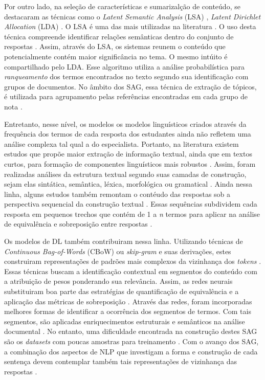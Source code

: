 Por outro lado, na seleção de características e sumarizalção de conteúdo, se destacaram as técnicas como o \textit{Latent Semantic Analysis} (LSA) \cite{landauer1998}, \textit{Latent Dirichlet Allocation} (LDA) \cite{blei2003}. O LSA é uma das mais utilizadas na literatura \cite{basu2013, sahu2020}. O uso desta técnica compreende identificar relações semânticas dentro do conjunto de respostas \cite{mohler2009}. Assim, através do LSA, os sistemas reunem o conteúdo que potencialmente contém maior significância no tema. O mesmo intúito é compartilhado pelo LDA. Esse algoritmo utiliza a análise probabilística para \textit{ranqueamento} dos termos encontrados no texto segundo sua identificação com grupos de documentos. No âmbito dos SAG, essa técnica de extração de tópicos, é utilizada para agrupamento pelas referências encontradas em cada grupo de nota \cite{basu2013, zhang2022}.

Entretanto, nesse nível, os modelos os modelos linguísticos criados através da frequência dos termos de cada resposta dos estudantes ainda não refletem uma análise complexa tal qual a do especialista. Portanto, na literatura existem estudos que propõe maior extração de informação textual, ainda que em textos curtos, para formação de componentes linguísticos mais robustos \cite{saha2018, zesch2018}. Assim, foram realizadas análises da estrutura textual segundo suas camadas de construção, sejam elas sintática, semântica, léxica, morfológica ou gramatical \cite{ramachandran2015b, roy2016}. Ainda nessa linha, alguns estudos também remontam o contéudo das respostas sob a perspectiva sequencial da construção textual \cite{kumar2017}. Essas sequências subdividem cada resposta em pequenos trechos que contém de 1 a \textit{n} termos para aplicar na análise de equivalência e sobreposição entre respostas \cite{jimenez2013, sakaguchi2015, sultan2016}.

Os modelos de DL também contribuiram nessa linha. Utilizando técnicas de \textit{Continuous Bag-of-Words} (CBoW) ou \textit{skip-gram} e suas derivações, estes construiram representações de padrões mais complexos da vizinhança dos \textit{tokens} \cite{mikolov2013}. Essas técnicas buscam a identificação contextual em segmentos do conteúdo com a atribuição de pesos ponderando sua relevância. Assim, as redes neurais substituiram boa parte das estratégias de quantificação de equivalência e a aplicação das métricas de sobreposição \cite{haller2022}. Através das redes, foram incorporadas melhores formas de identificar a ocorrência dos segmentos de termos. Com tais segmentos, são aplicadas enriquecimentos estruturais e semânticos na análise documental \cite{camus2020}. No entanto, uma dificuldade encontrada na construção destes SAG são os \textit{datasets} com poucas amostras para treinamento \cite{bonthu2021}. Com o avanço dos SAG, a combinação dos aspectos de NLP que investigam a forma e construção de cada sentença devem contemplar também tais representações de vizinhança das respostas \cite{riordan2019, kumar2019}.


